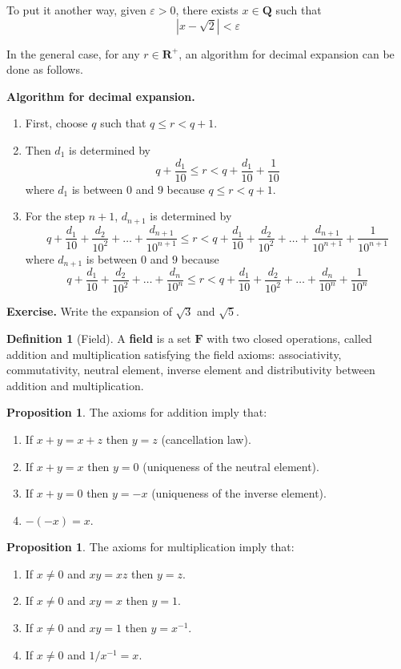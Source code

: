 \documentclass[tikz,12pt,a4paper]{article}
\theoremstyle{definition}
\newtheorem{proposition}[theorem]{Proposition}
\newtheorem{definition}{Definition}[section]
\begin{document}
To put it another way, given $\varepsilon > 0$, there exists $x \in \textbf{Q}$ such that \[ | x - \sqrt{2} | < \varepsilon \]

In the general case, for any $r \in \textbf{R}^+$, an algorithm for decimal expansion can be done as follows. 

\textbf{Algorithm for decimal expansion.}

\begin{enumerate}
	\item First, choose $q$ such that $ q \leq r < q + 1 $.
	\item Then $d_1$ is determined by \[ q + \frac{d_1}{10} \leq r < q + \frac{d_1}{10} + \frac{1}{10} \] where $d_1$ is between $0$ and $9$ because $ q \leq r < q + 1 $.
	\item For the step $n+1$, $d_{n+1}$ is determined by
	\[ q + \frac{d_1}{10} + \frac{d_2}{10^2} + \ldots + \frac{d_{n+1}}{10^{n+1}} \leq r < q + \frac{d_1}{10} + \frac{d_2}{10^2} + \ldots + \frac{d_{n+1}}{10^{n+1}} + \frac{1}{10^{n+1}} \]
	where $d_{n+1}$ is between $0$ and $9$ because 
	\[ q + \frac{d_1}{10} + \frac{d_2}{10^2} + \ldots + \frac{d_n}{10^n} \leq r < q + \frac{d_1}{10} + \frac{d_2}{10^2} + \ldots + \frac{d_n}{10^n} + \frac{1}{10^n} \]
\end{enumerate}

\textbf{Exercise.} Write the expansion of $\sqrt{3}$ and $\sqrt{5}$.

\begin{definition}[Field]
  A \textbf{field} is a set $\textbf{F}$ with two closed operations, called addition and multiplication satisfying the field axioms: associativity, commutativity, neutral element, inverse element and distributivity between addition and multiplication.
\end{definition}

\begin{proposition}
  The axioms for addition imply that:
  \begin{enumerate}
    \item If $x+y = x+z$ then $y = z$ (cancellation law).
    \item If $x+y = x$ then $y = 0$ (uniqueness of the neutral element).
    \item If $x+y = 0$ then $y = -x$ (uniqueness of the inverse element).
    \item $-(-x) = x$.
  \end{enumerate}
\end{proposition}

\begin{proposition}
  The axioms for multiplication imply that:
  \begin{enumerate}
    \item If $x \neq 0$ and $xy = xz$ then $y = z$.
    \item If $x \neq 0$ and $xy = x$ then $y = 1$.
    \item If $x \neq 0$ and $xy = 1$ then $y = x^{-1}$.
    \item If $x \neq 0$ and $1/x^{-1} = x$.
  \end{enumerate}
\end{proposition}
\end{document}
